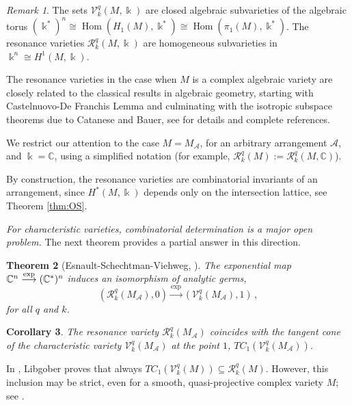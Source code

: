 \documentclass[psamsfonts]{conm-p-l}
\newtheorem{theorem}{Theorem}[section]
\newtheorem{corollary}[theorem]{Corollary}
\theoremstyle{definition}
\theoremstyle{remark}
\newtheorem{remark}[theorem]{Remark}
\numberwithin{equation}{section}
\newcommand{\A}{{\mathcal A}}
\newcommand{\RR}{{\mathcal R}}
\newcommand{\VV}{{\mathcal V}}
\newcommand{\C}{\mathbb{C}}
\DeclareMathOperator{\Hom}{Hom}
\begin{document}
\begin{remark}
\label{varieties}
The sets $\VV^q_k(M, \Bbbk)$ are closed algebraic subvarieties of the algebraic torus 
$(\Bbbk^*)^n \cong \Hom(H_1(M), \Bbbk^*) \cong \Hom(\pi_1(M), \Bbbk^*)$. The 
resonance varieties $\RR_{k}^{q}(M, \Bbbk)$ are homogeneous subvarieties in $\Bbbk^n \cong H^1(M, \Bbbk)$. 

The resonance varieties in the case when $M$ is a complex algebraic variety are closely related to the classical results in algebraic geometry, starting with Castelnuovo-De Franchis Lemma and culminating with the isotropic subspace theorems due to Catanese and Bauer, see \cite{D0} for details and complete references.
\end{remark}

  We restrict our attention to the case $M=M_{\A}$, for an arbitrary arrangement $\A$,  
  and $\Bbbk=\C$, using a simplified notation
  (for example, $\RR_{k}^{q}(M):=\RR_{k}^{q}(M, \C)$).
  
 By construction, the resonance varieties are combinatorial invariants of an arrangement, 
 since $H^*(M,\Bbbk)$ depends only on the intersection lattice, see Theorem \ref{thm:OS}.
 
{ \it For characteristic varieties, combinatorial determination is a major open problem.} 
The next theorem  
provides a partial answer in this direction.

\begin{theorem}[Esnault-Schechtman-Viehweg, \cite{ESV}]
\label{germs}
The exponential map $\C^n \\ \overset{\exp}\longrightarrow (\C^*)^n$  induces 
an isomorphism of analytic germs,
\begin{equation}
\label{germs1}
(\RR_{k}^{q}(M_{\A}),0) \overset{\exp}\longrightarrow (\VV^q_k(M_{\A}),1)\, ,
\end{equation}
for all $q$ and $k$.
\end{theorem}


\begin{corollary}
\label{tangentcone}
The resonance variety $\RR_{k}^{q}(M_{\A})$ coincides with the tangent cone of 
the characteristic variety $\VV^q_k(M_{\A})$ at the point $1$,
$TC_1 (\VV^q_k(M_{\A}))$.
\end{corollary}

In \cite{Lib2}, Libgober proves that always $TC_1 (\VV^q_k(M))\subseteq \RR_{k}^{q}(M)$.
However, this inclusion may be strict, even for a smooth, quasi-projective complex
variety $M$; see \cite{DPS}.
\end{document}
